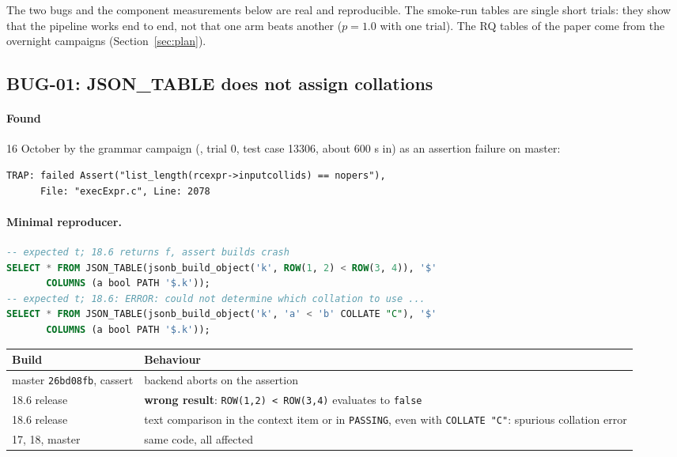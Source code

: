 \label{sec:results}

\begin{warnbox}
The two bugs and the component measurements below are real and reproducible.
The smoke-run tables are single short trials: they show that the pipeline
works end to end, not that one arm beats another ($p=1.0$ with one trial).
The RQ tables of the paper come from the overnight campaigns (Section~\ref{sec:plan}).
\end{warnbox}

\subsection{BUG-01: JSON\_TABLE does not assign collations}
\label{sec:bug01}

\paragraph{Found} 16 October by the grammar campaign (,
trial 0, test case 13306, about 600 s in) as an assertion failure on master:
\begin{lstlisting}
TRAP: failed Assert("list_length(rcexpr->inputcollids) == nopers"),
      File: "execExpr.c", Line: 2078
\end{lstlisting}

\paragraph{Minimal reproducer.}
\begin{lstlisting}[language=SQL]
-- expected t; 18.6 returns f, assert builds crash
SELECT * FROM JSON_TABLE(jsonb_build_object('k', ROW(1, 2) < ROW(3, 4)), '$'
       COLUMNS (a bool PATH '$.k'));
-- expected t; 18.6: ERROR: could not determine which collation to use ...
SELECT * FROM JSON_TABLE(jsonb_build_object('k', 'a' < 'b' COLLATE "C"), '$'
       COLUMNS (a bool PATH '$.k'));
\end{lstlisting}

\begin{center}
\small
\begin{tabularx}{\linewidth}{lX}
\toprule
Build & Behaviour \\
\midrule
master \texttt{26bd08fb}, cassert & backend aborts on the assertion \\
18.6 release & \textbf{wrong result}: \texttt{ROW(1,2) < ROW(3,4)} evaluates to \texttt{false} \\
18.6 release & text comparison in the context item or in \texttt{PASSING}, even with \texttt{COLLATE "C"}: spurious collation error \\
17, 18, master & same code, all affected \\
\bottomrule
\end{tabularx}
\end{center}

